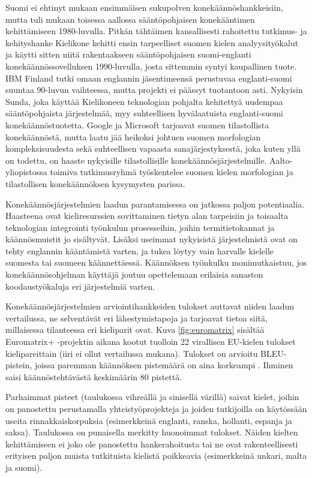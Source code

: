 \begin{multicols}{2}

Suomi ei ehtinyt mukaan ensimmäisen sukupolven konekäännöshankkeisiin, mutta tuli mukaan toisessa aallossa sääntöpohjaisen konekääntimen kehittämiseen 1980-luvulla. Pitkän tähtäimen kansallisesti rahoitettu tutkimus- ja kehityshanke Kielikone kehitti ensin tarpeelliset suomen kielen analyysityökalut ja käytti sitten niitä rakentaakseen sääntöpohjaisen suomi-englanti konekäännössovelluksen 1990-luvulla, josta sittemmin syntyi kaupallinen tuote. IBM Finland tutki omaan englannin jäsentimeensä perustuvaa englanti-suomi suuntaa 90-luvun vaihteessa, mutta projekti ei päässyt tuotantoon asti. Nykyisin Sunda, joka käyttää Kielikoneen teknologian pohjalta kehitettyä uudempaa sääntöpohjaista järjestelmää, myy suhteellisen hyvälaatuista englanti-suomi konekäännöstuotetta. Google ja Microsoft tarjoavat suomen tilastollista konekäännöstä, mutta laatu jää heikoksi johtuen suomen morfologian kompleksisuudesta sekä suhteellisen vapaasta sanajärjestyksestä, joka kuten yllä on todettu, on haaste nykyisille tilastollisille konekäännösjärjestelmille. Aalto-yliopistossa toimiva tutkimusryhmä työskentelee suomen kielen morfologian ja tilastollisen konekäännöksen kysymysten parissa.

Konekäännösjärjestelmien laadun parantamisessa on jatkossa paljon potentiaalia. Haasteena ovat kieliresurssien sovittaminen tietyn alan tarpeisiin ja toisaalta teknologian integrointi työnkulun prosesseihin, joihin termitietokannat ja käännösmuistit jo sisältyvät. Lisäksi useimmat nykyisistä järjestelmistä ovat on tehty englannin kääntämistä varten, ja tukea löytyy vain harvalle kielelle suomesta tai suomeen käännettäessä. Käännöksen työnkulku monimutkaistuu, jos konekäännösohjelman käyttäjä joutuu opettelemaan erilaisia sanaston koodaustyökaluja eri järjestelmiä varten.

Konekäännösjärjestelmien arviointihankkeiden tulokset auttavat niiden laadun vertailussa, ne selventävät eri lähestymistapoja ja tarjoavat tietoa siitä, millaisessa tilanteessa eri kieliparit ovat. Kuva \ref{fig:euromatrix} sisältää Euromatrix+ -projektin aikana kootut tuolloin 22 virallisen EU-kielen tulokset kielipareittain (iiri ei ollut vertailussa mukana). Tulokset on arvioitu BLEU-pistein, joissa paremman käännöksen pistemäärä on aina korkeampi \cite{BLEU}. Ihminen saisi käännöstehtävästä keskimäärin 80 pistettä.

Parhaimmat pisteet (taulukossa vihreällä ja sinisellä värillä) saivat kielet, joihin on panostettu perustamalla yhteistyöprojekteja ja joiden tutkijoilla on käytössään useita rinnakkaiskorpuksia (esimerkkeinä englanti, ranska, hollanti, espanja ja saksa). Taulukossa on punaisella merkitty huonoimmat tulokset.  Näiden kielten kehittämiseen ei joko ole panostettu hankerahoitusta tai ne ovat rakenteellisesti erityisen paljon muista tutkituista kielistä poikkeavia (esimerkkeinä unkari, malta ja suomi).


\end{multicols}
